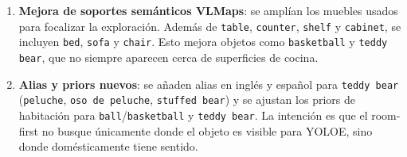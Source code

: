\documentclass[11pt,a4paper]{article}
\begin{document}
\begin{enumerate}
        confirmar desde el punto actual; si no lo consigue, continúa hacia el
        resto de puntos para buscar otro ángulo. Esto corrige casos como
        \texttt{mug} y \texttt{basketball}, donde una vista lateral débil no
        bastaba para confirmar.
  \item \textbf{Mejora de soportes semánticos VLMaps}: se amplían los muebles
        usados para focalizar la exploración. Además de \texttt{table},
        \texttt{counter}, \texttt{shelf} y \texttt{cabinet}, se incluyen
        \texttt{bed}, \texttt{sofa} y \texttt{chair}. Esto mejora objetos como
        \texttt{basketball} y \texttt{teddy bear}, que no siempre aparecen
        cerca de superficies de cocina.
  \item \textbf{Alias y priors nuevos}: se añaden alias en inglés y español
        para \texttt{teddy bear} (\texttt{peluche}, \texttt{oso de peluche},
        \texttt{stuffed bear}) y se ajustan los priors de habitación para
        \texttt{ball}/\texttt{basketball} y \texttt{teddy bear}. La intención
        es que el room-first no busque únicamente donde el objeto es visible
        para YOLOE, sino donde domésticamente tiene sentido.
\end{enumerate}
\end{document}
